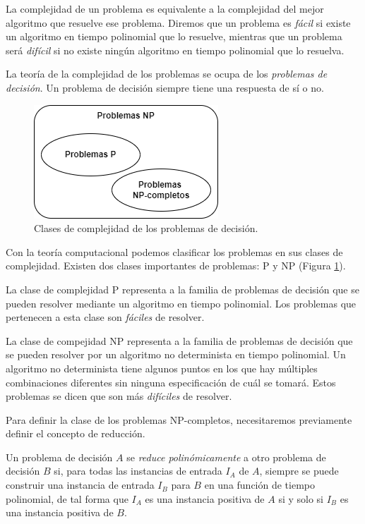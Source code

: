 La complejidad de un problema es equivalente a la complejidad del mejor algoritmo que resuelve ese problema. Diremos que un problema es \emph{fácil} si existe un algoritmo en tiempo polinomial que lo resuelve, mientras que un problema será \emph{difícil} si no existe ningún algoritmo en tiempo polinomial que lo resuelva.

La teoría de la complejidad de los problemas se ocupa de los \emph{problemas de decisión}. Un problema de decisión siempre tiene una respuesta de sí o no.

\begin{figure}[H]   
	\center
	\includegraphics[scale=0.5]{figures/Complejidad.png}
	\caption{Clases de complejidad de los problemas de decisión.}
    \label{fg:complexity}
\end{figure}

Con la teoría computacional podemos clasificar los problemas en sus clases de complejidad. Existen dos clases importantes de problemas: P y NP (Figura \ref{fg:complexity}).

La clase de complejidad P representa a la familia de problemas de decisión que se pueden resolver mediante un algoritmo en tiempo polinomial. Los problemas que pertenecen a esta clase son \emph{fáciles} de resolver.

La clase de compejidad NP representa a la familia de problemas de decisión que se pueden resolver por un algoritmo no determinista en tiempo polinomial. Un algoritmo no determinista tiene algunos puntos en los que hay múltiples combinaciones diferentes sin ninguna especificación de cuál se tomará. Estos problemas se dicen que son más \emph{difíciles} de resolver.

Para definir la clase de los problemas NP-completos, necesitaremos previamente definir el concepto de reducción.

\begin{definition}
    Un problema de decisión $A$ se \emph{reduce polinómicamente} a otro problema de decisión $B$ si, para todas las instancias de entrada $I_A$ de $A$, siempre se puede construir una instancia de entrada $I_B$ para $B$ en una función de tiempo polinomial, de tal forma que $I_A$ es una instancia positiva de $A$ si y solo si $I_B$ es una instancia positiva de $B$.
\end{definition}

